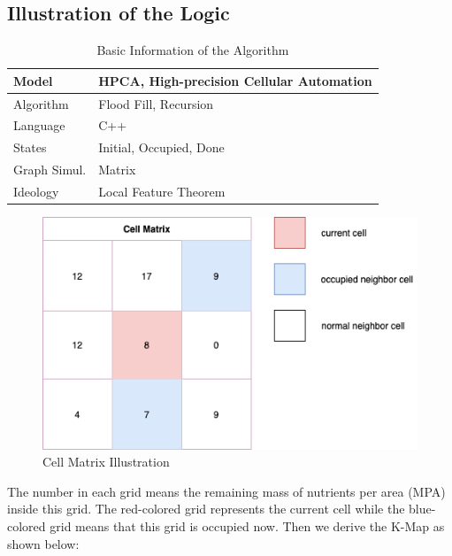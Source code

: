 \documentclass[12pt]{article}
\begin{document}
\subsection{Illustration of the Logic}
\begin{table}[H]
	\caption{Basic Information of the Algorithm}
	\label{tab:my-table}
	\centering
	\begin{tabular}{ll}
		\hline
		Model & HPCA, High-precision Cellular Automation \\ \hline
		Algorithm   & Flood Fill, Recursion         \\
		Language    & C++             \\
		States      & Initial, Occupied, Done              \\
		Graph Simul.& Matrix   \\
		Ideology    & Local Feature Theorem    \\
	    \cline{1-2}
	\end{tabular}
\end{table}

\begin{figure}[H]
	\small
	\centering
	\includegraphics[width=12cm]{./pictures/cell illustration.png}
	\caption{Cell Matrix Illustration}\label{jj}
\end{figure}

The number in each grid means the remaining mass of nutrients per area (MPA) inside this grid. The red-colored grid represents the current cell while the blue-colored grid means that this grid is occupied now. Then we derive the K-Map as shown below:
\end{document}

